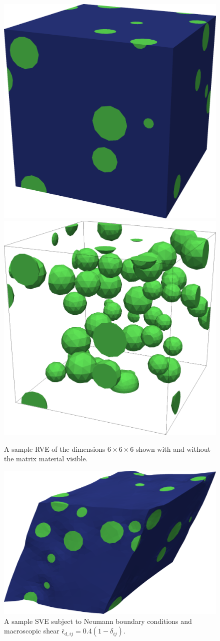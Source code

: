 \documentclass[12pt,a4paper]{article}
\renewcommand{\dev}{\mathrm{d}}
\begin{document}
\begin{figure}[H]
\centering
 \includegraphics[width=0.45\linewidth]{rve6.png}
 \includegraphics[width=0.45\linewidth]{rve6_inc.png}
\caption{A sample RVE of the dimensions $6\times6\times6$ shown with and without the matrix material visible.}
\label{fig:initial_rve6}
\end{figure}

\begin{figure}[htpb!]
\centering
 \includegraphics[width=0.7\linewidth]{rve6_def.png}
\caption{A sample SVE subject to Neumann boundary conditions and macroscopic shear $\bar{\epsilon}_{\dev,ij} = 0.4(1 - \delta_{ij})$.}
\label{fig:def_rve6}
\end{figure}
\end{document}
